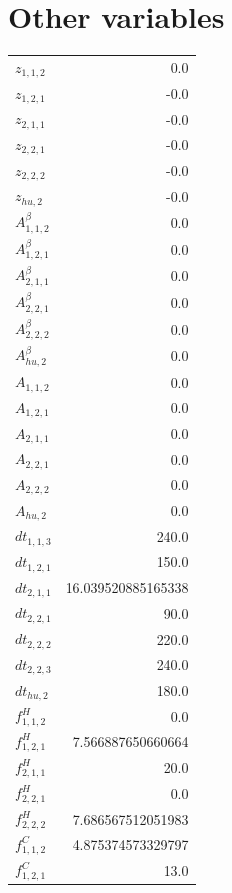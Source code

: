 \documentclass{article}%
\makeatletter
\let\mcnewpage=\newpage%
\newcommand{\TrickSupertabularIntoMulticols}{%
\renewcommand\newpage{%
\if@firstcolumn%
\hrule width\linewidth height0pt%
\columnbreak%
\else%
\mcnewpage%
\fi%
}%
}%
\makeatother
\begin{document}
\section{Other variables}%
\thispagestyle{plain}%
\begin{multicols*}{3}%
\TrickSupertabularIntoMulticols%
%
\begin{supertabular}{lr}%
	$z_{1,1,2}$ & 0.0 \\%
	$z_{1,2,1}$ & -0.0 \\%
	$z_{2,1,1}$ & -0.0 \\%
	$z_{2,2,1}$ & -0.0 \\%
	$z_{2,2,2}$ & -0.0 \\%
	$z_{hu,2}$ & -0.0 \\%
	$A_{1,1,2}^{\beta}$ & 0.0 \\%
	$A_{1,2,1}^{\beta}$ & 0.0 \\%
	$A_{2,1,1}^{\beta}$ & 0.0 \\%
	$A_{2,2,1}^{\beta}$ & 0.0 \\%
	$A_{2,2,2}^{\beta}$ & 0.0 \\%
	$A_{hu,2}^{\beta}$ & 0.0 \\%
	$A_{1,1,2}$ & 0.0 \\%
	$A_{1,2,1}$ & 0.0 \\%
	$A_{2,1,1}$ & 0.0 \\%
	$A_{2,2,1}$ & 0.0 \\%
	$A_{2,2,2}$ & 0.0 \\%
	$A_{hu,2}$ & 0.0 \\%
	$dt_{1,1,3}$ & 240.0 \\%
	$dt_{1,2,1}$ & 150.0 \\%
	$dt_{2,1,1}$ & 16.039520885165338 \\%
	$dt_{2,2,1}$ & 90.0 \\%
	$dt_{2,2,2}$ & 220.0 \\%
	$dt_{2,2,3}$ & 240.0 \\%
	$dt_{hu,2}$ & 180.0 \\%
	$f_{1,1,2}^{H}$ & 0.0 \\%
	$f_{1,2,1}^{H}$ & 7.566887650660664 \\%
	$f_{2,1,1}^{H}$ & 20.0 \\%
	$f_{2,2,1}^{H}$ & 0.0 \\%
	$f_{2,2,2}^{H}$ & 7.686567512051983 \\%
	$f_{1,1,2}^{C}$ & 4.875374573329797 \\%
	$f_{1,2,1}^{C}$ & 13.0 \\%

\end{supertabular}
\end{multicols*}
\end{document}
